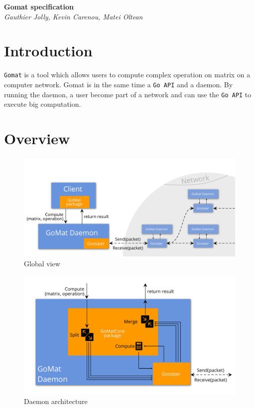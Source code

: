 \documentclass{article}
\newcommand{\Gomat}{\texttt{Gomat}\xspace}
\begin{document}
    \begin{titlepage}
        \begin{center}
            \Huge\textbf{Gomat specification}\\
            \large\textit{Gauthier Jolly, Kevin Carenou, Matei Oltean}\\
        \end{center}
        \vfill
        \tableofcontents
        \vfill
        \vfill
    \end{titlepage}
    \section{Introduction}
    \Gomat is a tool which allows users to compute complex operation on matrix on a computer network.
    Gomat is in the same time a \texttt{Go API} and a daemon. By running the daemon, a user become part of a network and can use
    the \texttt{Go API} to execute big computation.

    \section{Overview}
    \begin{figure}[!ht]
        \includegraphics[width=.95\textwidth]{global_view.pdf}
        \caption{Global view}
        \label{glbView}
    \end{figure}
    \begin{figure}[!ht]
        \includegraphics[width=.95\textwidth]{daemon_view.pdf}
        \caption{Daemon architecture}
        \label{daemonView}
    \end{figure}
\end{document}
